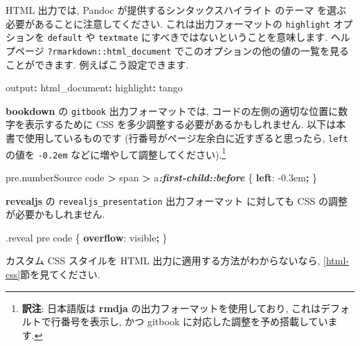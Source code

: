 \documentclass[
  11pt,
]{bxjsreport}
\newenvironment{Shaded}{\begin{snugshade}}{\end{snugshade}}
\newcommand{\AttributeTok}[1]{\textcolor[rgb]{0.77,0.63,0.00}{#1}}
\newcommand{\DataTypeTok}[1]{\textcolor[rgb]{0.13,0.29,0.53}{#1}}
\newcommand{\DecValTok}[1]{\textcolor[rgb]{0.00,0.00,0.81}{#1}}
\newcommand{\FunctionTok}[1]{\textcolor[rgb]{0.00,0.00,0.00}{#1}}
\newcommand{\InformationTok}[1]{\textcolor[rgb]{0.56,0.35,0.01}{\textbf{\textit{#1}}}}
\newcommand{\KeywordTok}[1]{\textcolor[rgb]{0.13,0.29,0.53}{\textbf{#1}}}
\newcommand{\NormalTok}[1]{#1}
\newcommand{\OperatorTok}[1]{\textcolor[rgb]{0.81,0.36,0.00}{\textbf{#1}}}
\begin{document}
HTML 出力では, Pandoc が提供するシンタックスハイライト のテーマ を選ぶ必要があることに注意してください. これは出力フォーマットの \texttt{highlight} オプションを \texttt{default} や \texttt{textmate} にすべきではないということを意味します. ヘルプページ \texttt{?rmarkdown::html\_document} でこのオプションの他の値の一覧を見ることができます. 例えばこう設定できます.

\begin{Shaded}
\begin{Highlighting}[]
\FunctionTok{output}\KeywordTok{:}
\AttributeTok{  }\FunctionTok{html\_document}\KeywordTok{:}
\AttributeTok{    }\FunctionTok{highlight}\KeywordTok{:}\AttributeTok{ tango}
\end{Highlighting}
\end{Shaded}

\textbf{bookdown} の \texttt{gitbook} 出力フォーマットでは, コードの左側の適切な位置に数字を表示するために CSS を多少調整する必要があるかもしれません. 以下は本書で使用しているものです (行番号がページ左余白に近すぎると思ったら, \texttt{left} の値を \texttt{-0.2em} などに増やして調整してください).\footnote{\textbf{訳注}: 日本語版は \textbf{rmdja} の出力フォーマットを使用しており, これはデフォルトで行番号を表示し, かつ gitbook に対応した調整を予め搭載しています.}

\begin{Shaded}
\begin{Highlighting}[]
\NormalTok{pre}\FunctionTok{.numberSource}\NormalTok{ code }\OperatorTok{\textgreater{}}\NormalTok{ span }\OperatorTok{\textgreater{}}\NormalTok{ a}\InformationTok{:first{-}child::before}\NormalTok{ \{}
  \KeywordTok{left}\NormalTok{: }\DecValTok{{-}0.3}\DataTypeTok{em}\OperatorTok{;}
\NormalTok{\}}
\end{Highlighting}
\end{Shaded}

\textbf{revealjs} の \texttt{revealjs\_presentation} 出力フォーマット \autocite{R-revealjs} に対しても CSS の調整が必要かもしれません.

\begin{Shaded}
\begin{Highlighting}[]
\FunctionTok{.reveal}\NormalTok{ pre code \{}
  \KeywordTok{overflow}\NormalTok{: }\DecValTok{visible}\OperatorTok{;}
\NormalTok{\}}
\end{Highlighting}
\end{Shaded}

カスタム CSS スタイルを HTML 出力に適用する方法がわからないなら, \ref{html-css}節を見てください.
\end{document}
